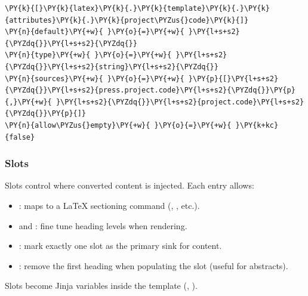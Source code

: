 \documentclass[a4paper,twoside]{article}
\begin{document}
\begin{tscode}[lang=toml, engine=pygments]
\begin{Verbatim}[commandchars=\\\{\},breaklines, breakanywhere, commandchars=\\\{\}]
\PY{k}{[}\PY{k}{latex}\PY{k}{.}\PY{k}{template}\PY{k}{.}\PY{k}{attributes}\PY{k}{.}\PY{k}{project\PYZus{}code}\PY{k}{]}
\PY{n}{default}\PY{+w}{ }\PY{o}{=}\PY{+w}{ }\PY{l+s+s2}{\PYZdq{}}\PY{l+s+s2}{\PYZdq{}}
\PY{n}{type}\PY{+w}{ }\PY{o}{=}\PY{+w}{ }\PY{l+s+s2}{\PYZdq{}}\PY{l+s+s2}{string}\PY{l+s+s2}{\PYZdq{}}
\PY{n}{sources}\PY{+w}{ }\PY{o}{=}\PY{+w}{ }\PY{p}{[}\PY{l+s+s2}{\PYZdq{}}\PY{l+s+s2}{press.project.code}\PY{l+s+s2}{\PYZdq{}}\PY{p}{,}\PY{+w}{ }\PY{l+s+s2}{\PYZdq{}}\PY{l+s+s2}{project.code}\PY{l+s+s2}{\PYZdq{}}\PY{p}{]}
\PY{n}{allow\PYZus{}empty}\PY{+w}{ }\PY{o}{=}\PY{+w}{ }\PY{k+kc}{false}
\end{Verbatim}
\end{tscode}
\subsubsection{Slots}
Slots control where converted content is injected. Each entry allows:
\begin{itemize}
\item {}: maps to a \LaTeX{} sectioning command (, , etc.).
\item {} and : fine tune heading levels when rendering.
\item {}: mark exactly one slot as the primary sink for content.
\item {}: remove the first heading when populating the slot (useful for abstracts).
\end{itemize}
Slots become Jinja variables inside the template (, ).
\end{document}
